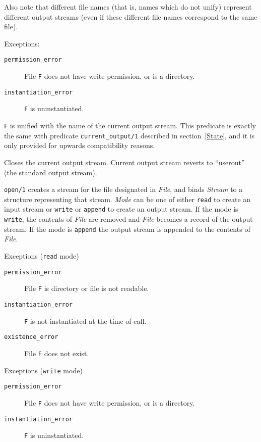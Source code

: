 \begin{description}
    Also note that different file names (that is, names which do not unify) 
    represent different output streams (even if these different file names 
    correspond to the same file).

    Exceptions:
    \begin {description}
    \item[{\tt permission\_error}]
	File {\tt F} does not have write permission, or is a directory.
    \item[{\tt instantiation\_error}]
	{\tt F} is uninstantiated.
    \end{description}

    {\tt F} is unified with the name of the current output stream.
    This predicate is exactly the same with predicate {\tt current\_output/1}
    described in section~\ref{State}, and it is only provided for
    upwards compatibility reasons.

    Closes the current output stream. 
    Current output stream reverts to ``userout'' (the standard output stream).

    {\tt open/1} creates a stream for the file designated in {\em
    File}, and binds {\em Stream} to a structure representing that
    stream.  {\em Mode} can be one of either {\tt read} to create an
    input stream or {\tt write} or {\tt append} to create an output
    stream.  If the mode is {\tt write}, the contents of {\em File}
    are removed and {\em File} becomes a record of the output stream.
    If the mode is {\tt append} the output stream is appended to the
    contents of {\em File}.

    Exceptions ({\tt read} mode)
    \begin{description}
    \item[{\tt permission\_error}]
    	File {\tt F} is directory or file is not readable. 
    \item[{\tt instantiation\_error}]
    	{\tt F} is not instantiated at the time of call. 
    \item[{\tt existence\_error}]
    	File {\tt F} does not exist. 
    \end{description}

    Exceptions ({\tt write} mode)
    \begin {description}
    \item[{\tt permission\_error}]
	File {\tt F} does not have write permission, or is a directory.
    \item[{\tt instantiation\_error}]
	{\tt F} is uninstantiated.
    \end{description}


\end{description}
